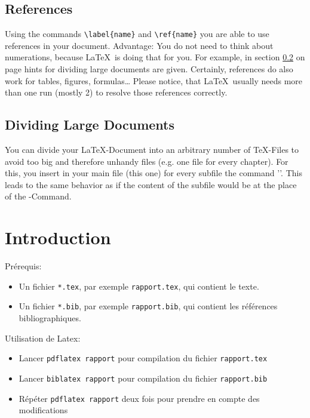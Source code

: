 \documentclass{article}
\begin{document}
\subsection{References}
\label{references}
Using the commands \verb#\label{name}# and \verb#\ref{name}# you are able
to use references in your document. Advantage: You do not need to think
about numerations, because \LaTeX\ is doing that for you.
For example, in section \ref{dividing} on page \pageref{dividing} hints for
dividing large documents are given.
Certainly, references do also work for tables, figures, formulas\ldots
Please notice, that \LaTeX\ usually needs more than one run (mostly 2) to
resolve those references correctly.
\subsection{Dividing Large Documents}
\label{dividing}
You can divide your \LaTeX-Document into an arbitrary number of \TeX-Files
to avoid too big and therefore unhandy files (e.g. one file for every chapter).
For this, you insert in your main file (this one) for every subfile
the command '\verb##'. This leads to the same behavior
as if the content of the subfile would be at the place of the
\verb##-Command.


\appendix
\section{Introduction}\label{sec:intro}

Prérequis:
\begin{itemize}
\item Un fichier \texttt{*.tex}, par exemple \texttt{rapport.tex}, qui
  contient le texte.
\item Un fichier \texttt{*.bib}, par exemple \texttt{rapport.bib}, qui
  contient les références bibliographiques.
\end{itemize}

Utilisation de Latex:
\begin{itemize}
\item Lancer \texttt{pdflatex rapport} pour compilation du fichier
  \texttt{rapport.tex}
\item Lancer \texttt{biblatex rapport} pour compilation du fichier
  \texttt{rapport.bib}
\item Répéter \texttt{pdflatex rapport} deux fois pour prendre en
  compte des modifications
\end{itemize}
\end{document}
